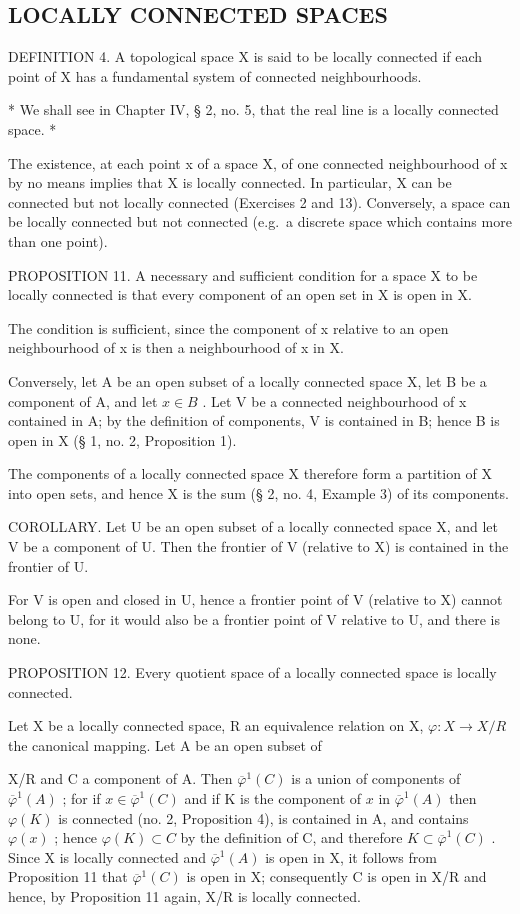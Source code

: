 \subsection{LOCALLY CONNECTED SPACES}

DEFINITION 4. A topological space X is said to be locally connected if each point of X has a fundamental system of connected neighbourhoods.

* We shall see in Chapter IV, § 2, no. 5, that the real line is a locally connected space. *

The existence, at each point x of a space X, of one connected neighbourhood of x by no means implies that X is locally connected. In particular, X can be connected but not locally connected (Exercises 2 and 13). Conversely, a space can be locally connected but not connected (e.g.~a discrete space which contains more than one point).

PROPOSITION 11. A necessary and sufficient condition for a space X to be locally connected is that every component of an open set in X is open in X.

The condition is sufficient, since the component of x relative to an open neighbourhood of x is then a neighbourhood of x in X.

Conversely, let A be an open subset of a locally connected space X, let B be a component of A, and let \(x \in B\) . Let V be a connected neighbourhood of x contained in A; by the definition of components, V is contained in B; hence B is open in X (§ 1, no. 2, Proposition 1).

The components of a locally connected space X therefore form a partition of X into open sets, and hence X is the sum (§ 2, no. 4, Example 3) of its components.

COROLLARY. Let U be an open subset of a locally connected space X, and let V be a component of U. Then the frontier of V (relative to X) is contained in the frontier of U.

For V is open and closed in U, hence a frontier point of V (relative to X) cannot belong to U, for it would also be a frontier point of V relative to U, and there is none.

PROPOSITION 12. Every quotient space of a locally connected space is locally connected.

Let X be a locally connected space, R an equivalence relation on X, \(\varphi: X \to X/R\) the canonical mapping. Let A be an open subset of

X/R and C a component of A. Then \(\overline{\varphi}^{1}(C)\) is a union of components of \(\overline{\varphi}^{1}(A)\) ; for if \(x \in \overline{\varphi}^{1}(C)\) and if K is the component of \(x\) in \(\overline{\varphi}^{1}(A)\) then \(\varphi(K)\) is connected (no. 2, Proposition 4), is contained in A, and contains \(\varphi(x)\) ; hence \(\varphi(K) \subset C\) by the definition of C, and therefore \(K \subset \overline{\varphi}^{1}(C)\) . Since X is locally connected and \(\overline{\varphi}^{1}(A)\) is open in X, it follows from Proposition 11 that \(\overline{\varphi}^{1}(C)\) is open in X; consequently C is open in X/R and hence, by Proposition 11 again, X/R is locally connected.

